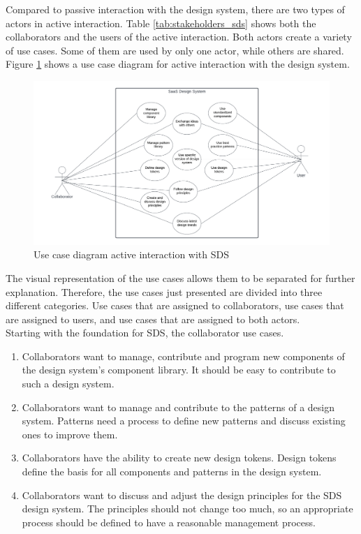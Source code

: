 Compared to passive interaction with the design system, there are two types of actors in active interaction. Table \ref{tab:stakeholders_sds} shows both the collaborators and the users of the active interaction. Both actors create a variety of use cases. Some of them are used by only one actor, while others are shared. Figure \ref{use_case_active} shows a use case diagram for active interaction with the design system. \\
\begin{figure}[htbp]
    \centerline{\includegraphics[width=\linewidth]{images/use_case_diagram_active.png}}
    \caption{Use case diagram active interaction with \ac{SDS}}
    \label{use_case_active}
\end{figure}
The visual representation of the use cases allows them to be separated for further explanation. Therefore, the use cases just presented are divided into three different categories. Use cases that are assigned to collaborators, use cases that are assigned to users, and use cases that are assigned to both actors. \\

Starting with the foundation for \ac{SDS}, the collaborator use cases.
\begin{enumerate}
    \item Collaborators want to manage, contribute and program new components of the design system's component library. It should be easy to contribute to such a design system.
    \item Collaborators want to manage and contribute to the patterns of a design system. Patterns need a process to define new patterns and discuss existing ones to improve them.
    \item Collaborators have the ability to create new design tokens. Design tokens define the basis for all components and patterns in the design system. 
    \item Collaborators want to discuss and adjust the design principles for the \ac{SDS} design system. The principles should not change too much, so an appropriate process should be defined to have a reasonable management process. 
\end{enumerate}

